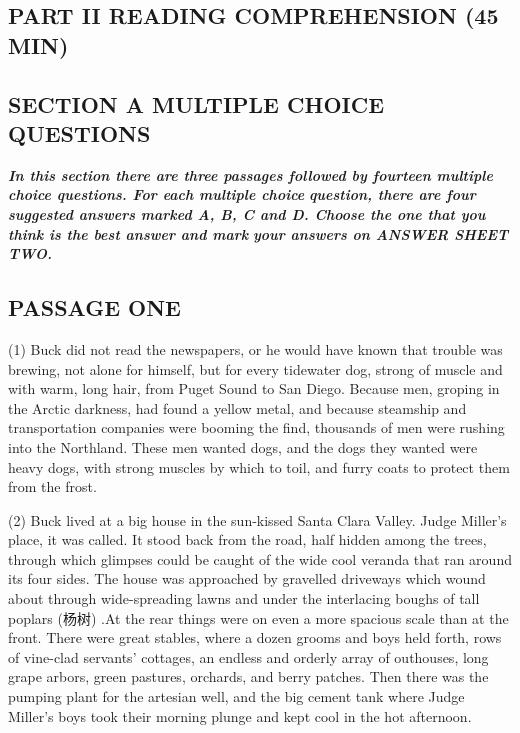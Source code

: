 \documentclass[UTF8,11pt]{ctexart}
\begin{document}
\subsection*{\textbf{PART II READING COMPREHENSION (45 MIN)}}


\subsection*{\textbf{SECTION A MULTIPLE CHOICE QUESTIONS}}


\textbf{\textit{In this section there are three passages followed by fourteen multiple choice questions. For each multiple choice}} \textbf{\textit{question, there are four suggested answers marked A, B, C and D. Choose the one that you think is the best answer and mark}} \textbf{\textit{your answers on ANSWER SHEET TWO.}}


\subsection*{\textbf{PASSAGE ONE}}


(1) Buck did not read the newspapers, or he would have known that trouble was brewing, not alone for himself, but for every tidewater dog, strong of muscle and with warm, long hair, from Puget Sound to San Diego. Because men, groping in the Arctic darkness, had found a yellow metal, and because steamship and transportation companies were booming the find, thousands of men were rushing into the Northland. These men wanted dogs, and the dogs they wanted were heavy dogs, with strong muscles by which to toil, and furry coats to protect them from the frost.


(2) Buck lived at a big house in the sun-kissed Santa Clara Valley. Judge Miller’s place, it was called. It stood back from the road, half hidden among the trees, through which glimpses could be caught of the wide cool veranda that ran around its four sides. The house was approached by gravelled driveways which wound about through wide-spreading lawns and under the interlacing boughs of tall poplars (杨树) .At the rear things were on even a more spacious scale than at the front. There were great stables, where a dozen grooms and boys held forth, rows of vine-clad servants’ cottages, an endless and orderly array of outhouses, long grape arbors, green pastures, orchards, and berry patches. Then there was the pumping plant for the artesian well, and the big cement tank where Judge Miller’s boys took their morning plunge and kept cool in the hot afternoon.
\end{document}
